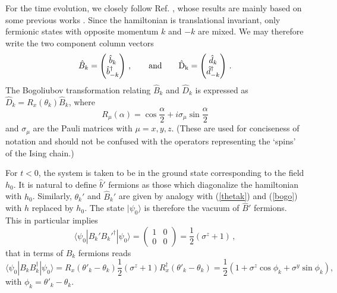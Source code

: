 \documentclass[12pt,preprint,tighten,eqsecnum,aps,floats,psfig,epsfig,amsmath,onecolumn]{revtex4-1}
\def\be{\begin{equation}}
\def\ee{\end{equation}}
\def\Fb{\hat{b}}
\def\FB{\hat{B}}
\def\Fd{\hat{d}}
\def\FD{\hat{D}}
\begin{document}
For the time evolution, we closely follow Ref. \cite{sps-04}, whose 
results are mainly based on some previous works \cite{bm-72,ir-00}. 
Since the hamiltonian is translational invariant,
only fermionic states with opposite momentum $k$ and $-k$
are mixed. We may therefore write the two component column vectors
\be
\FB_k =
\begin{pmatrix}
\Fb_k\\
\Fb_{-k}^\dag
\end{pmatrix}\,,
\qquad\rm{and} \qquad
\FD_k =
\begin{pmatrix}
\Fd_k\\
\Fd_{-k}^\dag
\end{pmatrix}\,.
\ee 
The Bogoliubov transformation relating $\FB_k$ and $\FD_k$ is
expressed as $\FD_k = R_x(\theta_k) \FB_k$, where 
\be 
R_\mu(\alpha)= \cos\frac{\alpha}{2} + i\sigma_\mu\sin\frac{\alpha}{2} 
\ee 
and $\sigma_\mu$ are the Pauli matrices with $\mu=x,y,z$. (These are used for
conciseness of notation and should not be confused with the
operators representing the `spins' of the Ising chain.)

For $t < 0$, the system is taken to be in the ground state corresponding to 
the field $h_0$.
It is natural to define $\Fb'$ fermions as those which
diagonalize the hamiltonian with $h_0$. 
Similarly, $\theta_k'$ and $\FB_k'$ are given by
analogy with (\ref{thetak}) and (\ref{bogo}) with $h$ replaced by $h_0$.
The state $|\psi_0\rangle$ is therefore the vacuum of $\FB'$
fermions. This in particular implies 
\be 
\langle\psi_0 |
B_k' B_k'^\dag|\psi_0\rangle =
\begin{pmatrix}
1 & 0\\
0 & 0
\end{pmatrix}
= \frac{1}{2}(\sigma^z + 1)\,,
\ee 
that in terms of $B_k$ fermions reads
\be 
\langle\psi_0| B_k B_k^\dag|\psi_0\rangle = 
R_{x}(\theta'_k -\theta_k) \frac{1}{2}(\sigma^z + 1) 
R_x^\dag(\theta'_k - \theta_k)=
\frac{1}{2}(1 + \sigma^z \cos\phi_k + \sigma^y \sin \phi_k), 
\ee 
with $\phi_k = \theta'_k - \theta_k$.
\end{document}
